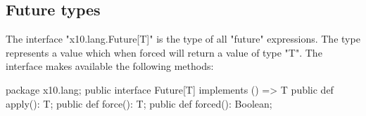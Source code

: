 \subsection{Future types}

The interface \xcd"x10.lang.Future[T]"
is the type of all \xcd"future" expressions.
The type represents a value which when forced will return a value of type
\xcd"T". The interface makes available the following methods:

\begin{xten}
package x10.lang;
public interface Future[T] implements () => T {
  public def apply(): T;
  public def force(): T;
  public def forced(): Boolean;
}
\end{xten}
  
